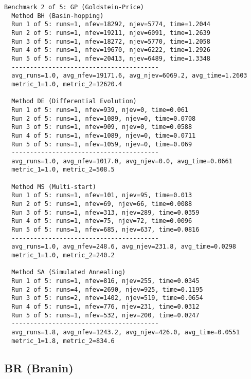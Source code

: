 \footnotesize
\begin{verbatim}
Benchmark 2 of 5: GP (Goldstein-Price)
  Method BH (Basin-hopping)
  Run 1 of 5: runs=1, nfev=18292, njev=5774, time=1.2044
  Run 2 of 5: runs=1, nfev=19211, njev=6091, time=1.2639
  Run 3 of 5: runs=1, nfev=18272, njev=5770, time=1.2058
  Run 4 of 5: runs=1, nfev=19670, njev=6222, time=1.2926
  Run 5 of 5: runs=1, nfev=20413, njev=6489, time=1.3348
  ----------------------------------------
  avg_runs=1.0, avg_nfev=19171.6, avg_njev=6069.2, avg_time=1.2603
  metric_1=1.0, metric_2=12620.4

  Method DE (Differential Evolution)
  Run 1 of 5: runs=1, nfev=939, njev=0, time=0.061
  Run 2 of 5: runs=1, nfev=1089, njev=0, time=0.0708
  Run 3 of 5: runs=1, nfev=909, njev=0, time=0.0588
  Run 4 of 5: runs=1, nfev=1089, njev=0, time=0.0711
  Run 5 of 5: runs=1, nfev=1059, njev=0, time=0.069
  ----------------------------------------
  avg_runs=1.0, avg_nfev=1017.0, avg_njev=0.0, avg_time=0.0661
  metric_1=1.0, metric_2=508.5

  Method MS (Multi-start)
  Run 1 of 5: runs=1, nfev=101, njev=95, time=0.013
  Run 2 of 5: runs=1, nfev=69, njev=66, time=0.0088
  Run 3 of 5: runs=1, nfev=313, njev=289, time=0.0359
  Run 4 of 5: runs=1, nfev=75, njev=72, time=0.0096
  Run 5 of 5: runs=1, nfev=685, njev=637, time=0.0816
  ----------------------------------------
  avg_runs=1.0, avg_nfev=248.6, avg_njev=231.8, avg_time=0.0298
  metric_1=1.0, metric_2=240.2

  Method SA (Simulated Annealing)
  Run 1 of 5: runs=1, nfev=816, njev=255, time=0.0345
  Run 2 of 5: runs=4, nfev=2690, njev=925, time=0.1195
  Run 3 of 5: runs=2, nfev=1402, njev=519, time=0.0654
  Run 4 of 5: runs=1, nfev=776, njev=231, time=0.0312
  Run 5 of 5: runs=1, nfev=532, njev=200, time=0.0247
  ----------------------------------------
  avg_runs=1.8, avg_nfev=1243.2, avg_njev=426.0, avg_time=0.0551
  metric_1=1.8, metric_2=834.6

\end{verbatim}

\subsection{BR (Branin)}

